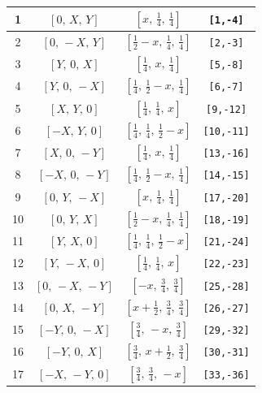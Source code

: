 \documentclass[fleqn,8pt]{jsarticle}
\begin{document}
\begin{longtable}{cccc}
1 & $\left[ 0,\, X,\, Y \right]$ & $\left[ x,\, \frac{1}{4},\, \frac{1}{4} \right]$ & {\tt [1,-4]} \\ \hline
2 & $\left[ 0,\, - X,\, Y \right]$ & $\left[ \frac{1}{2} - x,\, \frac{1}{4},\, \frac{1}{4} \right]$ & {\tt [2,-3]} \\ \hline
3 & $\left[ Y,\, 0,\, X \right]$ & $\left[ \frac{1}{4},\, x,\, \frac{1}{4} \right]$ & {\tt [5,-8]} \\ \hline
4 & $\left[ Y,\, 0,\, - X \right]$ & $\left[ \frac{1}{4},\, \frac{1}{2} - x,\, \frac{1}{4} \right]$ & {\tt [6,-7]} \\ \hline
5 & $\left[ X,\, Y,\, 0 \right]$ & $\left[ \frac{1}{4},\, \frac{1}{4},\, x \right]$ & {\tt [9,-12]} \\ \hline
6 & $\left[ - X,\, Y,\, 0 \right]$ & $\left[ \frac{1}{4},\, \frac{1}{4},\, \frac{1}{2} - x \right]$ & {\tt [10,-11]} \\ \hline
7 & $\left[ X,\, 0,\, - Y \right]$ & $\left[ \frac{1}{4},\, x,\, \frac{1}{4} \right]$ & {\tt [13,-16]} \\ \hline
8 & $\left[ - X,\, 0,\, - Y \right]$ & $\left[ \frac{1}{4},\, \frac{1}{2} - x,\, \frac{1}{4} \right]$ & {\tt [14,-15]} \\ \hline
9 & $\left[ 0,\, Y,\, - X \right]$ & $\left[ x,\, \frac{1}{4},\, \frac{1}{4} \right]$ & {\tt [17,-20]} \\ \hline
10 & $\left[ 0,\, Y,\, X \right]$ & $\left[ \frac{1}{2} - x,\, \frac{1}{4},\, \frac{1}{4} \right]$ & {\tt [18,-19]} \\ \hline
11 & $\left[ Y,\, X,\, 0 \right]$ & $\left[ \frac{1}{4},\, \frac{1}{4},\, \frac{1}{2} - x \right]$ & {\tt [21,-24]} \\ \hline
12 & $\left[ Y,\, - X,\, 0 \right]$ & $\left[ \frac{1}{4},\, \frac{1}{4},\, x \right]$ & {\tt [22,-23]} \\ \hline
13 & $\left[ 0,\, - X,\, - Y \right]$ & $\left[ - x,\, \frac{3}{4},\, \frac{3}{4} \right]$ & {\tt [25,-28]} \\ \hline
14 & $\left[ 0,\, X,\, - Y \right]$ & $\left[ x + \frac{1}{2},\, \frac{3}{4},\, \frac{3}{4} \right]$ & {\tt [26,-27]} \\ \hline
15 & $\left[ - Y,\, 0,\, - X \right]$ & $\left[ \frac{3}{4},\, - x,\, \frac{3}{4} \right]$ & {\tt [29,-32]} \\ \hline
16 & $\left[ - Y,\, 0,\, X \right]$ & $\left[ \frac{3}{4},\, x + \frac{1}{2},\, \frac{3}{4} \right]$ & {\tt [30,-31]} \\ \hline
17 & $\left[ - X,\, - Y,\, 0 \right]$ & $\left[ \frac{3}{4},\, \frac{3}{4},\, - x \right]$ & {\tt [33,-36]} \\ \hline

\end{longtable}
\end{document}
